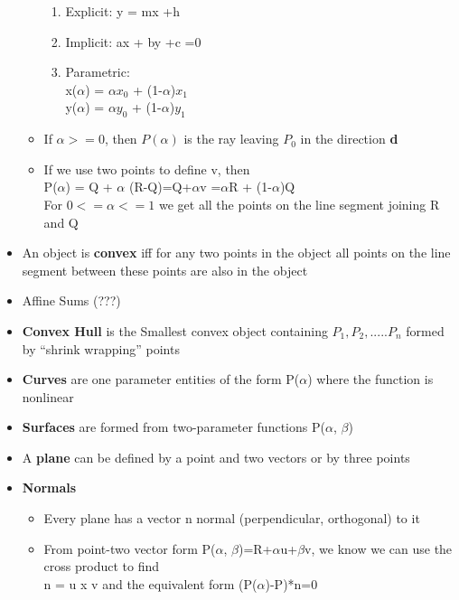 \documentclass[11pt,a4paper]{article}
\begin{document}
\begin{itemize}
\begin{itemize}
						\begin{enumerate}
							\item Explicit: y = mx +h
							\item Implicit: ax + by +c =0
							\item Parametric:\\
							x($\alpha$) = $\alpha x_0$ + (1-$\alpha$)$x_1$ \\
							y($\alpha$) = $\alpha y_0$  + (1-$\alpha$)$y_1$
						\end{enumerate}
					\item If $\alpha >= 0$, then $P(\alpha)$ is the ray leaving $P_0$ in the direction \textbf{d}
					\item If we use two points to define v, then\\
						 P($\alpha$) = Q + $\alpha$ (R-Q)=Q+$\alpha$v =$\alpha$R + (1-$\alpha$)Q\\
						 For $0<=\alpha<=1$ we get all the points on the line segment joining R and Q
				\end{itemize}			
			\item An object is \textbf{convex} iff for any two points in the object all points on the line segment between these points are also in the object
			\item Affine Sums (???)
			\item \textbf{Convex Hull} is the Smallest convex object containing $P_1, P_2, ..... P_n$ formed by “shrink wrapping” points
			\item \textbf{Curves} are one parameter entities of the form P($\alpha$) where the function is nonlinear
			\item \textbf{Surfaces} are formed from two-parameter functions P($\alpha$, $\beta$)	
			\item A \textbf{plane} can be defined by a point and two vectors or by three points
			\item \textbf{Normals}
				\begin{itemize}
					\item Every plane has a vector n normal (perpendicular, orthogonal) to it	
					\item From point-two vector form P($\alpha$, $\beta$)=R+$\alpha$u+$\beta$v, we know we can use the cross product to find\\
					n = u x v and the equivalent form (P($\alpha$)-P)*n=0 	
				\end{itemize}
		\end{itemize}
\end{document}
